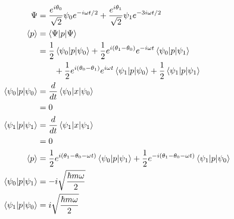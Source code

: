\documentclass{article}
\begin{document}
\begin{align*}
  \Psi                         & = \frac{e^{i \theta_0}}{\sqrt{2}} \psi_0 e^{-i \omega t / 2} + \frac{e^{i \theta_1}}{\sqrt{2}} \psi_1 e^{-3 i \omega t / 2}                                                     \\
  \braket{p}                   & = \braket{\Psi | p | \Psi}                                                                                                                                                      \\
                               & = \frac{1}{2} \braket{\psi_0 | p | \psi_0} + \frac{1}{2} e^{i (\theta_1 - \theta_0)} e^{-i \omega t} \braket{\psi_0 | p | \psi_1}                                               \\
                               & \qquad + \frac{1}{2} e^{i (\theta_0 - \theta_1)} e^{i \omega t} \braket{\psi_1 | p | \psi_0} + \frac{1}{2} \braket{\psi_1 | p | \psi_1}                                         \\
  \braket{\psi_0 | p | \psi_0} & = \frac{d}{d t} \braket{\psi_0 | x | \psi_0}                                                                                                                                    \\
                               & = 0                                                                                                                                                                             \\
  \braket{\psi_1 | p | \psi_1} & = \frac{d}{d t} \braket{\psi_1 | x | \psi_1}                                                                                                                                    \\
                               & = 0                                                                                                                                                                             \\
  \braket{p}                   & = \frac{1}{2} e^{i (\theta_1 - \theta_0 - \omega t)} \braket{\psi_0 | p | \psi_1} + \frac{1}{2} e^{-i (\theta_1 - \theta_0 - \omega t)} \braket{\psi_1 | p | \psi_0}            \\
  \braket{\psi_0 | p | \psi_1} & = -i \sqrt{\frac{\hbar m \omega}{2}}                                                                                                                                            \\
  \braket{\psi_1 | p | \psi_0} & = i \sqrt{\frac{\hbar m \omega}{2}}                                                                                                                                             \\

\end{align*}
\end{document}
